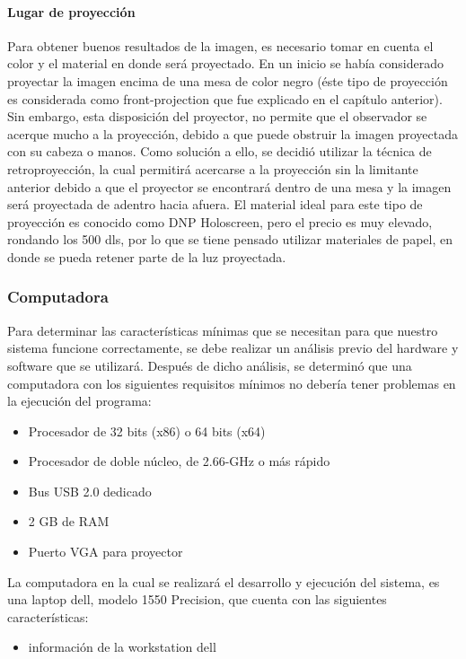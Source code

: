 \documentclass[a4paper,openright,12pt]{report}
\begin{document}
\paragraph{Lugar de proyección}
Para obtener buenos resultados de la imagen, es necesario tomar en cuenta el color y el material en donde será proyectado. En un inicio se había considerado proyectar la imagen encima de una mesa de color negro (éste tipo de proyección es considerada como front-projection que fue explicado en el capítulo anterior). Sin embargo, esta disposición del proyector, no permite que el observador se acerque mucho a la proyección, debido a que puede obstruir la imagen proyectada con su cabeza o manos. Como solución a ello, se decidió utilizar la técnica de retroproyección, la cual permitirá acercarse a la proyección sin la limitante anterior debido a que el proyector se encontrará dentro de una mesa y la imagen será proyectada de adentro hacia afuera. El material ideal para este tipo de proyección es conocido como DNP Holoscreen, pero el precio es muy elevado, rondando los 500 dls, por lo que se tiene pensado utilizar materiales de papel, en donde se pueda retener parte de la luz proyectada.\\
\subsubsection{Computadora}
Para determinar las características mínimas que se necesitan para que nuestro sistema funcione correctamente, se debe realizar un análisis previo del hardware y software que se utilizará. Después de dicho análisis, se determinó que una computadora con los siguientes requisitos mínimos no debería tener problemas en la ejecución del programa:
\begin{itemize}
	\item Procesador de 32 bits (x86) o 64 bits (x64)
	\item Procesador de doble núcleo, de 2.66-GHz o más rápido
	\item Bus USB 2.0 dedicado
	\item 2 GB de RAM
	\item Puerto VGA para proyector
\end{itemize}
La computadora en la cual se realizará el desarrollo y ejecución del sistema, es una laptop dell, modelo 1550 Precision, que cuenta con las siguientes características: 
\begin{itemize}
	\item información de la workstation dell
\end{itemize}
\end{document}
